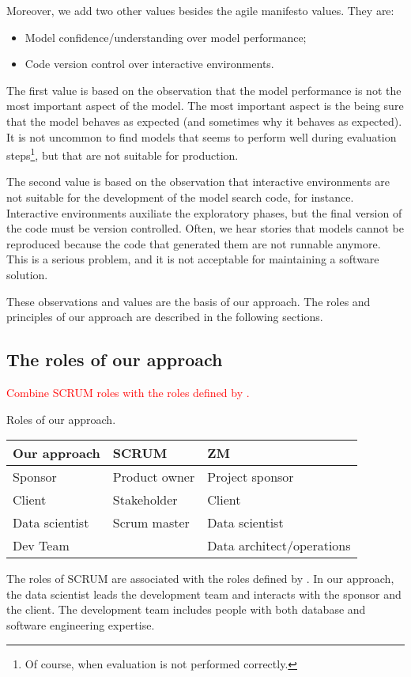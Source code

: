 Moreover, we add two other values besides the agile manifesto values.  They are:
\begin{itemize}
  \itemsep0em
  \item Model confidence/understanding over model performance;
  \item Code version control over interactive environments.
\end{itemize}

The first value is based on the observation that the model performance is not the most
important aspect of the model.  The most important aspect is the being sure that the model
behaves as expected (and sometimes why it behaves as expected).  It is not uncommon to find
models that seems to perform well during evaluation steps\footnote{Of course, when
evaluation is not performed correctly.}, but that are not suitable for production.

The second value is based on the observation that interactive environments are not suitable
for the development of the model search code, for instance.  Interactive environments
auxiliate the exploratory phases, but the final version of the code must be version
controlled.  Often, we hear stories that models cannot be reproduced because the code that
generated them are not runnable anymore.  This is a serious problem, and it is not
acceptable for maintaining a software solution.

These observations and values are the basis of our approach.  The roles and principles of
our approach are described in the following sections.

\subsection{The roles of our approach}

\textcolor{red}{Combine SCRUM roles with the roles defined by \textcite{Zumel2019}.}

\begin{tablebox}[label=tab:roles]{Roles of our approach.}
  \centering
  \begin{tabular}{lll}
    \toprule
    \textbf{Our approach} & \textbf{SCRUM} & \textbf{ZM} \\
    \midrule
    Sponsor & Product owner & Project sponsor \\
    Client & Stakeholder & Client \\
    Data scientist & Scrum master & Data scientist \\
    Dev Team & & Data architect/operations \\
    \bottomrule
  \end{tabular}
  \tcblower
  The roles of SCRUM are associated with the roles defined by \textcite{Zumel2019}.
  In our approach, the data scientist leads the development team and interacts with the sponsor
  and the client.  The development team includes people with both database and software
  engineering expertise.
\end{tablebox}

